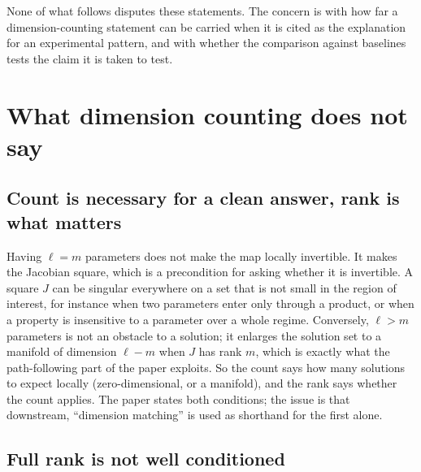 \documentclass[11pt]{article}
\begin{document}
None of what follows disputes these statements. The concern is with how far a dimension-counting statement can be carried when it is cited as the explanation for an experimental pattern, and with whether the comparison against baselines tests the claim it is taken to test.

\section{What dimension counting does not say}

\subsection{Count is necessary for a clean answer, rank is what matters}

Having $\ell=m$ parameters does not make the map locally invertible. It makes the Jacobian square, which is a precondition for asking whether it is invertible. A square $J$ can be singular everywhere on a set that is not small in the region of interest, for instance when two parameters enter only through a product, or when a property is insensitive to a parameter over a whole regime. Conversely, $\ell>m$ parameters is not an obstacle to a solution; it enlarges the solution set to a manifold of dimension $\ell-m$ when $J$ has rank $m$, which is exactly what the path-following part of the paper exploits. So the count says how many solutions to expect locally (zero-dimensional, or a manifold), and the rank says whether the count applies. The paper states both conditions; the issue is that downstream, ``dimension matching'' is used as shorthand for the first alone.

\subsection{Full rank is not well conditioned}
\end{document}
